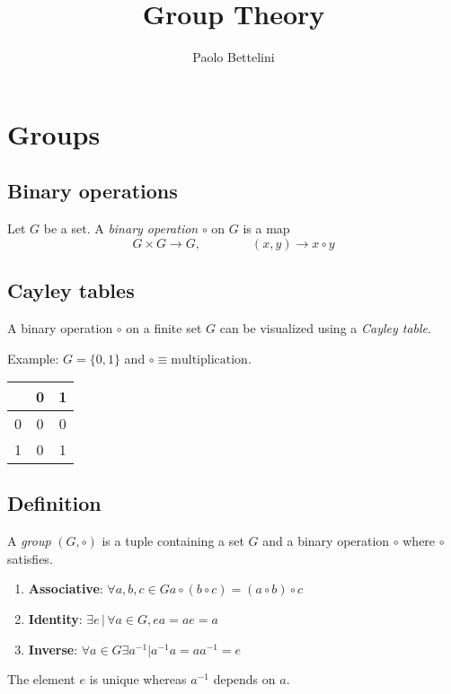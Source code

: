 \documentclass{article}
\title{Group Theory}
\author{Paolo Bettelini}
\date{}
\begin{document}
\maketitle
\tableofcontents
\pagebreak

\section{Groups}

\subsection{Binary operations}

Let \(G\) be a set. A \textit{binary operation} \(\circ\) on \(G\) is a map
\[
    G \times G \to G,
    \quad\quad\quad\quad
    (x,y) \to x \circ y
\]


\subsection{Cayley tables}

A binary operation \(\circ\) on a finite set \(G\) can be
visualized using a \textit{Cayley table}.

Example: \(G=\{0,1\}\) and \(\circ \equiv \text{multiplication}\).
\begin{tabular}{|c|c|c|}
    \hline
    \circ{} & 0 & 1 \\
    \hline
    0 & 0 & 0 \\
    \hline
    1 & 0 & 1 \\
    \hline
\end{tabular}

\subsection{Definition}

A \textit{group} \((G,\circ)\) is a tuple containing a set \(G\) and
a binary operation \(\circ\) where \(\circ\) satisfies.

\begin{enumerate}
    \item \textbf{Associative}: \(\forall a,b,c\in G a \circ (b \circ c) = (a \circ b) \circ c\)
    \item \textbf{Identity}: \(\exists e \,|\, \forall a \in G, ea=ae=a\) 
    \item \textbf{Inverse}: \(\forall a\in G \exists a^{-1} | a^{-1}a = aa^{-1} = e\)
\end{enumerate}

The element \(e\) is unique whereas \(a^{-1}\) depends on \(a\).

\end{document}
